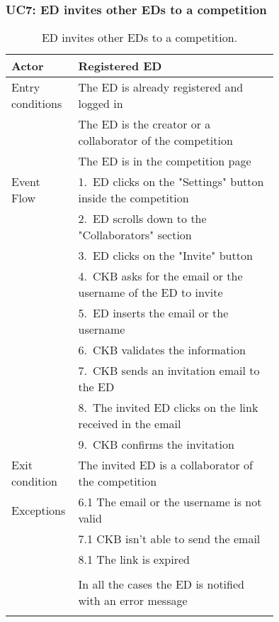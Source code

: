 \subsubsection*{UC7: ED invites other EDs to a competition}
\begin{center}
  \begin{longtable}{l|p{0.75\linewidth}}
    \hline
    Actor & Registered ED \\
    \hline
    Entry conditions & The ED is already registered and logged in  \\
    & The ED is the creator or a collaborator of the competition \\
    & The ED is in the competition page \\
    \hline
    Event Flow & 1.\ ED clicks on the "Settings" button inside the competition\\
    & 2.\ ED scrolls down to the "Collaborators" section \\
    & 3.\ ED clicks on the "Invite" button \\
    & 4.\ CKB asks for the email or the username of the ED to invite \\
    & 5.\ ED inserts the email or the username \\
    & 6.\ CKB validates the information \\
    & 7.\ CKB sends an invitation email to the ED \\
    & 8.\ The invited ED clicks on the link received in the email \\
    & 9.\ CKB confirms the invitation  \\
    \hline
    Exit condition & The invited ED is a collaborator of the competition \\
    \hline
    Exceptions & 6.1 The email or the username is not valid \\
    & 7.1 CKB isn’t able to send the email \\
    & 8.1 The link is expired \\ \\
    & In all the cases the ED is notified with an error message \\
    \hline
    \caption{ED invites other EDs to a competition.}
    \label{tab: ED_invite_ED}
  \end{longtable}
\end{center}

